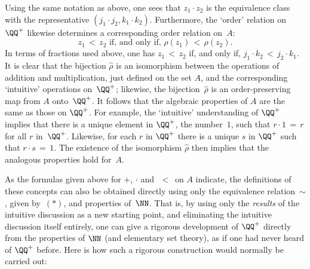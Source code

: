 {\begin{displaymath}
        \end{displaymath}
    Using the same notation as above, one sees that $z_{1}{\cdot}z_{2}$ is the equivalence class
    with the representative $(j_{1}{\cdot}j_{2}, k_{1}{\cdot}k_{2})$.
    Furthermore, the `order' relation on ${\QQ}^{+}$ likewise determines a corresponding order relation on~$A$:
        \begin{displaymath}
        z_{1}\,<\,z_{2} \mbox{ if, and only if, } {\rho}(z_{1})\,<\,{\rho}(z_{2}).
        \end{displaymath}
    In terms of fractions used above, one has $z_{1}\,<\,z_{2}$ if, and only if, $j_{1}{\cdot}k_{2}\,<\,j_{2}{\cdot}k_{1}$.
    It is clear that the bijection $\hat{{\rho}}$ is an isomorphism between the operations of addition and multiplication,
    just defined on the set $A$, and the corresponding `intuitive' operations on~${\QQ}^{+}$;
    likewise, the bijection~$\hat{{\rho}}$ is an order-preserving map from $A$ onto~${\QQ}^{+}$.
    It follows that the algebraic properties of $A$ are the same as those on ${\QQ}^{+}$.
    For example, the `intuitive' understanding of ${\QQ}^{+}$ implies that there is a unique element in ${\QQ}^{+}$, the number~$1$, such that $r{\cdot}1\,=\, r$
    for all $r$ in~${\QQ}^{+}$. Likewise, for each $r$ in ${\QQ}^{+}$ there is a unique $s$ in ${\QQ}^{+}$ such that $r{\cdot}s \,=\, 1$.
    The existence of the isomorphism $\hat{{\rho}}$ then implies that the analogous properties hold for~$A$.

        As the formulas given above for $+$, ${\cdot}$ and~$\,<\,$ on $A$ indicate,
    the definitions of these concepts can also be obtained directly using only the equivalence relation~$\sim$, given by~$({\ast})$, and properties of~${\NN}$.
    That is, by using only the {\em results} of the intuitive discussion as a new starting point, and eliminating the intuitive discussion itself entirely,
    one can give a rigorous development of ${\QQ}^{+}$ directly from the properties of ${\NN}$ (and elementary set theory),
    as if one had never heard of ${\QQ}^{+}$ before. Here is how such a rigorous construction would normally be carried out:

}
